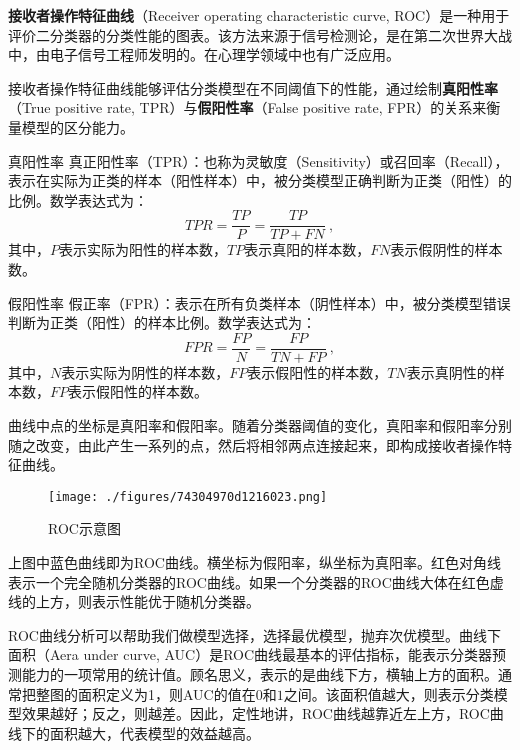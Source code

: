

\textbf{接收者操作特征曲线}（Receiver operating characteristic curve, ROC）是一种用于评价二分类器的分类性能的图表。该方法来源于信号检测论，是在第二次世界大战中，由电子信号工程师发明的。在心理学领域中也有广泛应用。

接收者操作特征曲线能够评估分类模型在不同阈值下的性能，通过绘制\textbf{真阳性率}（True positive rate, TPR）与\textbf{假阳性率}（False positive rate, FPR）的关系来衡量模型的区分能力。

\begin{definition}{真阳性率}
真正阳性率（TPR）：也称为灵敏度（Sensitivity）或召回率（Recall），表示在实际为正类的样本（阳性样本）中，被分类模型正确判断为正类（阳性）的比例。数学表达式为：
\begin{equation}
TPR=\frac{TP}{P}=\frac{TP}{TP+FN}~,
\end{equation}
其中，$P$表示实际为阳性的样本数，$TP$表示真阳的样本数，$FN$表示假阴性的样本数。
\end{definition}

\begin{definition}{假阳性率}
假正率（FPR）：表示在所有负类样本（阴性样本）中，被分类模型错误判断为正类（阳性）的样本比例。数学表达式为：
\begin{equation}
FPR=\frac{FP}{N}=\frac{FP}{TN+FP}~,
\end{equation}
其中，$N$表示实际为阴性的样本数，$FP$表示假阳性的样本数，$TN$表示真阴性的样本数，$FP$表示假阳性的样本数。
\end{definition}

曲线中点的坐标是真阳率和假阳率。随着分类器阈值的变化，真阳率和假阳率分别随之改变，由此产生一系列的点，然后将相邻两点连接起来，即构成接收者操作特征曲线。

\begin{figure}[ht]
\centering
\texttt{[image: ./figures/74304970d1216023.png]}
\caption{ROC示意图} \label{fig_ROC_1}
\end{figure}
上图中蓝色曲线即为ROC曲线。横坐标为假阳率，纵坐标为真阳率。红色对角线表示一个完全随机分类器的ROC曲线。如果一个分类器的ROC曲线大体在红色虚线的上方，则表示性能优于随机分类器。

ROC曲线分析可以帮助我们做模型选择，选择最优模型，抛弃次优模型。曲线下面积（Aera under curve, AUC）是ROC曲线最基本的评估指标，能表示分类器预测能力的一项常用的统计值。顾名思义，表示的是曲线下方，横轴上方的面积。通常把整图的面积定义为1，则AUC的值在$0$和$1$之间。该面积值越大，则表示分类模型效果越好；反之，则越差。因此，定性地讲，ROC曲线越靠近左上方，ROC曲线下的面积越大，代表模型的效益越高。

